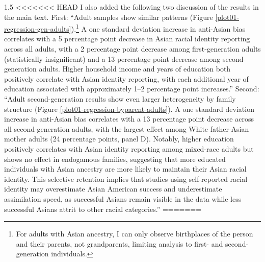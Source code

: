 \documentclass[12pt,english]{article}
\newcommand{\rrxspc}{1.5}
\begin{document}
\begin{refsection}
\begin{spacing}{\rrxspc}
<<<<<<< HEAD
        I also added the following two discussion of the results in the main text. First: ``Adult samples show similar patterns (Figure \ref{plot01-regression-gen-adults}).\footnote{For adults with Asian ancestry, I can only observe birthplaces of the person and their parents, not grandparents, limiting analysis to first- and second-generation individuals.} A one standard deviation increase in anti-Asian bias correlates with a 5 percentage point decrease in Asian racial identity reporting across all adults, with a 2 percentage point decrease among first-generation adults (statistically insignificant) and a 13 percentage point decrease among second-generation adults. Higher household income and years of education both positively correlate with Asian identity reporting, with each additional year of education associated with approximately 1--2 percentage point increases.'' Second: ``Adult second-generation results show even larger heterogeneity by family structure (Figure \ref{plot01-regression-byparent-adults}). A one standard deviation increase in anti-Asian bias correlates with a 13 percentage point decrease across all second-generation adults, with the largest effect among White father-Asian mother adults (24 percentage points, panel D). Notably, higher education positively correlates with Asian identity reporting among mixed-race adults but shows no effect in endogamous families, suggesting that more educated individuals with Asian ancestry are more likely to maintain their Asian racial identity. This selective retention implies that studies using self-reported racial identity may overestimate Asian American success and underestimate assimilation speed, as successful Asians remain visible in the data while less successful Asians attrit to other racial categories.''
=======

\end{spacing}
\end{refsection}
\end{document}
